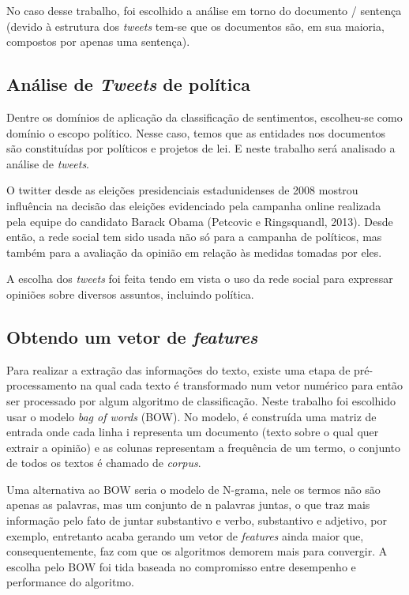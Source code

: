 No caso desse trabalho, foi escolhido a análise em torno do documento / sentença (devido à estrutura
dos \textit{tweets} tem-se que os documentos são, em sua maioria, compostos por apenas uma 
sentença). 

\subsection{Análise de \textit{Tweets} de política}

Dentre os domínios de aplicação da classificação de sentimentos, escolheu-se como domínio o
escopo político. Nesse caso, temos que as entidades nos documentos são constituídas por
políticos e projetos de lei. E neste trabalho será analisado a análise de \textit{tweets}.

O twitter desde as eleições presidenciais estadunidenses de 2008 mostrou influência
na decisão das eleições evidenciado pela campanha online realizada pela equipe do
candidato Barack Obama (Petcovic e Ringsquandl, 2013). Desde então, 
a rede social tem sido usada não só para a campanha de políticos, mas também para a avaliação
da opinião em relação às medidas tomadas por eles.

A escolha dos \textit{tweets} foi feita tendo em vista o uso da rede social 
para expressar opiniões sobre diversos assuntos, incluindo política.


\subsection{Obtendo um vetor de \textit{features}}
\label{subsec:featurization}

Para realizar a extração das informações do texto, existe uma etapa de pré-processamento na qual
cada texto é transformado num vetor numérico para então ser processado por algum algoritmo de
classificação. Neste trabalho foi escolhido usar o modelo \textit{bag of words} (BOW). No modelo, 
é construída uma matriz de entrada onde cada linha i representa um documento (texto sobre o qual
quer extrair a opinião) e as colunas representam a frequência de um termo, o conjunto de todos os textos é chamado de \textit{corpus}.

Uma alternativa ao BOW seria o modelo de N-grama, nele os termos não são apenas as palavras, mas
um conjunto de n palavras juntas, o que traz mais informação pelo fato de juntar substantivo e verbo, substantivo e adjetivo, por exemplo, entretanto acaba gerando um vetor de \textit{features}
ainda maior que, consequentemente, faz com que os algoritmos demorem mais para convergir.
A escolha pelo BOW foi tida baseada no compromisso entre desempenho e performance do algoritmo.

